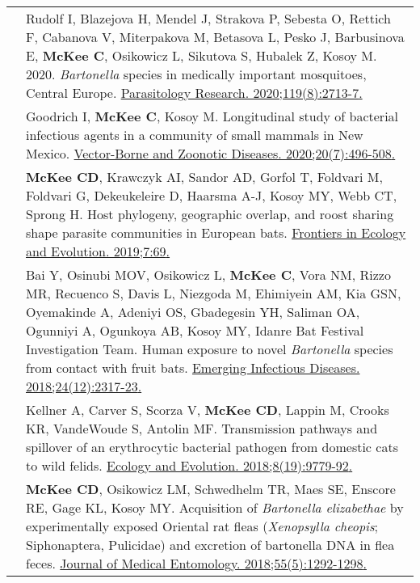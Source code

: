 \documentclass[letterpaper]{deedy-resume} %
\begin{document}
\begin{tabular}{>{\raggedright\arraybackslash}p{2cm}p{16cm}}
2020 & Rudolf I, Blazejova H, Mendel J, Strakova P, Sebesta O, Rettich F, Cabanova V, Miterpakova M, Betasova L, Pesko J, Barbusinova E, \textbf{McKee C}, Osikowicz L, Sikutova S, Hubalek Z, Kosoy M. 2020. \textit{Bartonella} species in medically important mosquitoes, Central Europe. \href{https://doi.org/10.1007/s00436-020-06732-1}{\textcolor{special}{Parasitology Research. 2020;119(8):2713-7}.} \\

2020 & Goodrich I, \textbf{McKee C}, Kosoy M. Longitudinal study of bacterial infectious agents in a community of small mammals in New Mexico. \href{https://doi.org/10.1089/vbz.2019.2550}{\textcolor{special}{Vector-Borne and Zoonotic Diseases. 2020;20(7):496-508}.} \\

2019 & \textbf{McKee CD}, Krawczyk AI, Sandor AD, Gorfol T, Foldvari M, Foldvari G, Dekeukeleire D, Haarsma A-J, Kosoy MY, Webb CT, Sprong H. Host phylogeny, geographic overlap, and roost sharing shape parasite communities in European bats. \href{https://doi.org/10.3389/fevo.2019.00069}{\textcolor{special}{Frontiers in Ecology and Evolution. 2019;7:69}.} \\

2018 & Bai Y, Osinubi MOV, Osikowicz L, \textbf{McKee C}, Vora NM, Rizzo MR, Recuenco S, Davis L, Niezgoda M, Ehimiyein AM, Kia GSN, Oyemakinde A, Adeniyi OS, Gbadegesin YH, Saliman OA, Ogunniyi A, Ogunkoya AB, Kosoy MY, Idanre Bat Festival Investigation Team. Human exposure to novel \textit{Bartonella} species from contact with fruit bats. \href{https://doi.org/10.3201/eid2412.181204}{\textcolor{special}{Emerging Infectious Diseases. 2018;24(12):2317-23}.} \\

2018 & Kellner A, Carver S, Scorza V, \textbf{McKee CD}, Lappin M, Crooks KR, VandeWoude S, Antolin MF. Transmission pathways and spillover of an erythrocytic bacterial pathogen from domestic cats to wild felids. \href{https://doi.org/10.1002/ece3.4451}{\textcolor{special}{Ecology and Evolution. 2018;8(19):9779-92}.} \\

2018 & \textbf{McKee CD}, Osikowicz LM, Schwedhelm TR, Maes SE, Enscore RE, Gage KL, Kosoy MY. Acquisition of \textit{Bartonella elizabethae} by experimentally exposed Oriental rat fleas (\textit{Xenopsylla cheopis}; Siphonaptera, Pulicidae) and excretion of bartonella DNA in flea feces. \href{https://doi.org/10.1093/jme/tjy085}{\textcolor{special}{Journal of Medical Entomology. 2018;55(5):1292-1298}.} \\


\end{tabular}
\end{document}
